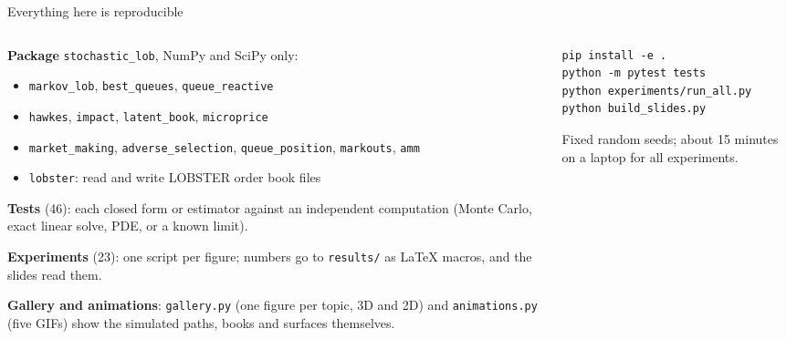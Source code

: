 \begin{frame}[fragile]{Everything here is reproducible}
  \begin{columns}[T]
    \begin{column}{0.5\textwidth}
      \small
      \textbf{Package} \texttt{stochastic\_lob}, NumPy and SciPy only:
      \begin{itemize}
        \item \texttt{markov\_lob}, \texttt{best\_queues}, \texttt{queue\_reactive}
        \item \texttt{hawkes}, \texttt{impact}, \texttt{latent\_book}, \texttt{microprice}
        \item \texttt{market\_making}, \texttt{adverse\_selection}, \texttt{queue\_position}, \texttt{markouts}, \texttt{amm}
        \item \texttt{lobster}: read and write LOBSTER order book files
      \end{itemize}
      \textbf{Tests} (46): each closed form or estimator against an independent computation (Monte Carlo, exact linear solve, PDE, or a known limit).

      \textbf{Experiments} (23): one script per figure; numbers go to \texttt{results/} as \LaTeX{} macros, and the slides read them.

      \textbf{Gallery and animations}: \texttt{gallery.py} (one figure per topic, 3D and 2D) and \texttt{animations.py} (five GIFs) show the simulated paths, books and surfaces themselves.
    \end{column}
    \begin{column}{0.46\textwidth}
\begin{verbatim}
pip install -e .
python -m pytest tests
python experiments/run_all.py
python build_slides.py
\end{verbatim}
      \small
      Fixed random seeds; about 15 minutes on a laptop for all experiments.
    \end{column}
  \end{columns}
\end{frame}

